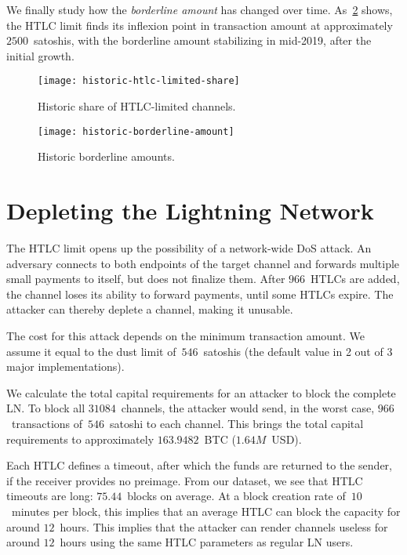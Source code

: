 We finally study how the \textit{borderline amount} has changed over time.
As~\cref{fig:historic-borderline-amount} shows, the HTLC limit finds its inflexion point in transaction amount at approximately $2500$~satoshis, with the borderline amount stabilizing in mid-2019, after the initial growth.

\begin{figure}[tb]
	\centering
	\texttt{[image: historic-htlc-limited-share]}
	\caption{Historic share of HTLC-limited channels.}
	\label{fig:historic-htlc-limited-share}
\end{figure}

\begin{figure}[tb]
	\centering
	\texttt{[image: historic-borderline-amount]}
	\caption{Historic borderline amounts.}
	\label{fig:historic-borderline-amount}
\end{figure}


\section{Depleting the Lightning Network}

The HTLC limit opens up the possibility of a network-wide DoS attack.
An adversary connects to both endpoints of the target channel and forwards multiple small payments to itself, but does not finalize them.
After $966$~HTLCs are added, the channel loses its ability to forward payments, until some HTLCs expire.
The attacker can thereby deplete a channel, making it unusable.

The cost for this attack depends on the minimum transaction amount.
We assume it equal to the dust limit of~$546$~satoshis (the default value in 2 out of 3 major implementations).

We calculate the total capital requirements for an attacker to block the complete LN\@.
To block all $31084$~channels, the attacker would send, in the worst case, $966$~transactions of~$546$~satoshi to each channel.
This brings the total capital requirements to approximately $163.9482$~BTC ($1.64M$~USD).

Each HTLC defines a timeout, after which the funds are returned to the sender, if the receiver provides no preimage.
From our dataset, we see that HTLC timeouts are long: $75.44$~blocks on average.
At a block creation rate of~$10$~minutes per block, this implies that an average HTLC can block the capacity for around $12$~hours.
This implies that the attacker can render channels useless for around $12$~hours using the same HTLC parameters as regular LN users.

